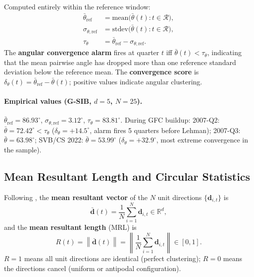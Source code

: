 \documentclass[journal]{IEEEtran}
\newcommand{\R}{\mathbb{R}}
\newcommand{\norm}[1]{\left\lVert#1\right\rVert}
\begin{document}
\begin{definition}
\label{def:tau_theta}
Computed entirely within the reference window:
\begin{align}
  \bar\theta_{\mathrm{ref}} &= \text{mean}\bigl(\bar\theta(t): t \in \mathcal{R}\bigr),
  \label{eq:theta_refmean}\\
  \sigma_{\theta,\mathrm{ref}} &= \text{stdev}\bigl(\bar\theta(t): t \in \mathcal{R}\bigr),
  \label{eq:theta_refstd}\\
  \tau_\theta &= \bar\theta_{\mathrm{ref}} - \sigma_{\theta,\mathrm{ref}}.
  \label{eq:tau_theta}
\end{align}
The \textbf{angular convergence alarm} fires at quarter $t$ iff
$\bar\theta(t) < \tau_\theta$, indicating that the mean pairwise angle has
dropped more than one reference standard deviation below the reference mean.
The \textbf{convergence score} is $\delta_\theta(t) = \bar\theta_{\mathrm{ref}}
- \bar\theta(t)$; positive values indicate angular clustering.
\end{definition}

\paragraph{Empirical values (G-SIB, $d=5$, $N=25$).}
$\bar\theta_{\mathrm{ref}} = 86.93^\circ$,
$\sigma_{\theta,\mathrm{ref}} = 3.12^\circ$,
$\tau_\theta = 83.81^\circ$.
During GFC buildup:
2007-Q2: $\bar\theta = 72.42^\circ < \tau_\theta$ ($\delta_\theta = +14.5^\circ$,
alarm fires 5 quarters before Lehman);
2007-Q3: $\bar\theta = 63.98^\circ$;
SVB/CS 2022: $\bar\theta = 53.99^\circ$ ($\delta_\theta = +32.9^\circ$,
most extreme convergence in the sample).

\subsection{Mean Resultant Length and Circular Statistics}
\label{ssec:mrl}

\begin{definition}
\label{def:mrl}
Following \citet{mardia2000directional}, the \textbf{mean resultant vector}
of the $N$ unit directions $\{\mathbf{d}_{i,t}\}$ is
\begin{equation}
  \bar{\mathbf{d}}(t) = \frac{1}{N}\sum_{i=1}^{N}\mathbf{d}_{i,t} \in \R^d,
  \label{eq:mean_dir}
\end{equation}
and the \textbf{mean resultant length} (MRL) is
\begin{equation}
  R(t) = \norm{\bar{\mathbf{d}}(t)} = \left\|\frac{1}{N}\sum_{i=1}^{N}\mathbf{d}_{i,t}\right\| \in [0,1].
  \label{eq:R}
\end{equation}
$R=1$ means all unit directions are identical (perfect clustering);
$R=0$ means the directions cancel (uniform or antipodal configuration).
\end{definition}
\end{document}
